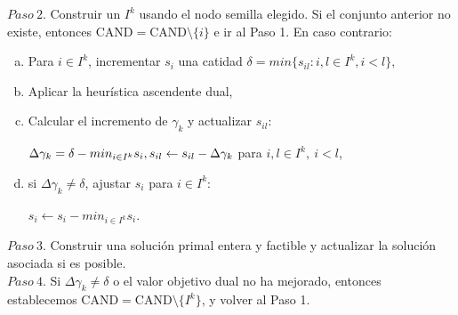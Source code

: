 \documentclass[twoside,12pt]{article}
\begin{document}
$Paso\ 2$. Construir un $I^{k}$ usando el nodo semilla elegido. Si el conjunto anterior no existe, entonces $\text{CAND}=\text{CAND}\setminus\{i\}$ e ir al Paso 1. En caso contrario:
\begin{enumerate}[a.]
    \item Para $i\in I^{k}$, incrementar $s_{i}$ una catidad $\delta=min\{s_{il}:i,l\in I^{k},i<l\},$
    \item Aplicar la heurística ascendente dual,
    \item Calcular el incremento de $\gamma_{k}$ y actualizar $s_{il}$:
        \begin{center}
        $\Delta\gamma_{k}=\delta-min_{i\in I^{k}}s_{i},\newline
        s_{il}\leftarrow s_{il}-\Delta\gamma_{k}$ para $i,l\in I^{k},\ i<l$,
        \end{center}
    \item si $\Delta\gamma_{k}\neq\delta$, ajustar $s_{i}$ para $i\in I^{k}$:
        \begin{center}
        $s_{i}\leftarrow s_{i}-min_{i\in I^{k}} s_{i}$.
        \end{center}
\end{enumerate}

$Paso\ 3$. Construir una solución primal entera y factible y actualizar la solución asociada si es posible.\\

$Paso\ 4$. Si $\Delta\gamma_{k}\neq\delta$ o el valor objetivo dual no ha mejorado, entonces establecemos $\text{CAND}=\text{CAND}\setminus\{I^{k}\}$, y volver al Paso 1.\\
\end{document}
